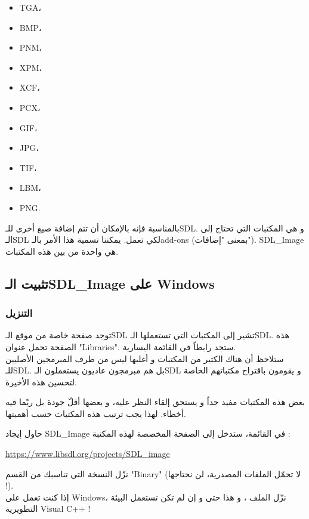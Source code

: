 \begin{itemize}
	\item \textenglish{TGA}،
	\item \textenglish{BMP}،
	\item \textenglish{PNM}،
	\item \textenglish{XPM}،
	\item \textenglish{XCF}،
	\item \textenglish{PCX}،
	\item \textenglish{GIF}،
	\item \textenglish{JPG}،
	\item \textenglish{TIF}،
	\item \textenglish{LBM}،
	\item \textenglish{PNG}.
\end{itemize}

بالمناسبة فإنه بالإمكان أن تتم إضافة صيغ أخرى للـ\textenglish{SDL}.
و هي المكتبات التي تحتاج إلى الـ\textenglish{SDL}
لكي تعمل. يمكننا تسمية هذا الأمر بالـ\textenglish{add-ons}
(بمعنى "إضافات").
\textenglish{SDL\_Image}
هي واحدة من بين هذه المكتبات.

\subsection{تثبيت الـ\textenglish{SDL\_Image} على \textenglish{Windows}}

\subsubsection{التنزيل}

توجد صفحة خاصة من موقع الـ\textenglish{SDL}
تشير إلى المكتبات التي تستعملها الـ\textenglish{SDL}.
هذه الصفحة تحمل عنوان
"\textenglish{Libraries}".
ستجد رابطاً في القائمة اليسارية.\\
ستلاحظ أن هناك الكثير من المكتبات و أغلبها ليس من طرف المبرمجين الأصليين للـ\textenglish{SDL}.
بل هم مبرمجون عاديون يستعملون الـ\textenglish{SDL}
و يقومون باقتراح مكتباتهم الخاصة لتحسين هذه الأخيرة.

بعض هذه المكتبات مفيد جداً و يستحق إلقاء النظر عليه، و بعضها أقلّ جودة بل ربّما فيه أخطاء. لهذا يجب ترتيب هذه المكتبات حسب أهميتها.

حاول إيجاد
\textenglish{SDL\_Image}
في القائمة، ستدخل إلى الصفحة المخصصة لهذه المكتبة :

\url{https://www.libsdl.org/projects/SDL_image}

نزّل النسخة التي تناسبك من القسم
"\textenglish{Binary}"
(لا تحمّل الملفات المصدرية، لن نحتاجها !).\\
إذا كنت تعمل على
\textenglish{Windows}،
نزّل الملف
،
و هذا حتى و إن لم تكن تستعمل البيئة التطويرية 
\textenglish{Visual C++} !


